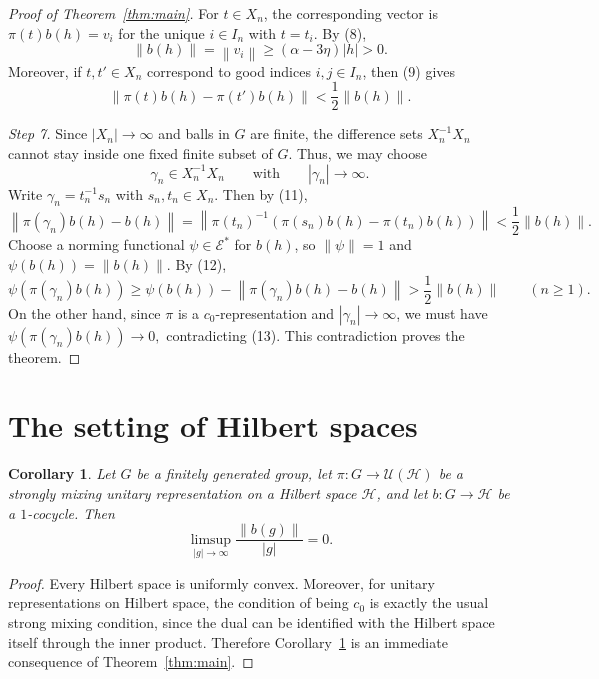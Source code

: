 \documentclass[a4paper,11pt]{amsproc}
\newtheorem{corollary}[theorem]{Corollary}
\theoremstyle{remark}
\newcommand{\norm}[1]{\left\lVert #1\right\rVert}
\newcommand{\cE}{\mathcal E}
\newcommand{\cH}{\mathcal H}
\begin{document}
\begin{proof}[Proof of Theorem~\ref{thm:main}]
For $t\in X_{n}$, the corresponding vector is
$
\pi(t)b(h)=v_{i}
$
for the unique $i\in I_{n}$ with $t=t_{i}$. By (8),
\[
\norm{b(h)}=\norm{v_{i}}\ge (\alpha-3\eta)|h|>0.
\tag{10}
\]
Moreover, if $t,t'\in X_{n}$ correspond to good indices $i,j\in I_{n}$, then (9) gives
\[
\lVert\pi(t)b(h)-\pi(t')b(h)\rVert<\frac12\norm{b(h)}.
\tag{11}
\]

\medskip

\noindent
\emph{Step 7.}
Since $|X_{n}|\to\infty$ and balls in $G$ are finite, the difference sets $X_{n}^{-1}X_{n}$ cannot stay inside one fixed finite subset of $G$. Thus, we may choose
\[
\gamma_{n}\in X_{n}^{-1}X_{n}
\qquad\text{with}\qquad
|\gamma_{n}|\to\infty.
\]
Write $\gamma_{n}=t_{n}^{-1}s_{n}$ with $s_{n},t_{n}\in X_{n}$. Then by (11),
\[
\norm{\pi(\gamma_{n})b(h)-b(h)}
=\norm{\pi(t_{n})^{-1}(\pi(s_{n})b(h)-\pi(t_{n})b(h))}<\frac12\norm{b(h)}.
\tag{12}
\]
Choose a norming functional $\psi\in \cE^{\ast}$ for $b(h)$, so $\norm{\psi}=1$ and $\psi(b(h))=\norm{b(h)}$. By (12),
\[
\psi(\pi(\gamma_{n})b(h))
\ge \psi(b(h))-\norm{\pi(\gamma_{n})b(h)-b(h)}
>\frac12\norm{b(h)}
\qquad (n\ge 1).
\tag{13}
\]
On the other hand, since $\pi$ is a $c_{0}$-representation and $|\gamma_{n}|\to\infty$, we must have
$
\psi(\pi(\gamma_{n})b(h))\to 0,
$
contradicting (13). This contradiction proves the theorem.
\end{proof}



\section{The setting of Hilbert spaces}

\begin{corollary}\label{cor:hilbert}
Let $G$ be a finitely generated group, let $\pi\colon G\to \mathcal U(\cH)$ be a strongly mixing unitary representation on a Hilbert space $\cH$, and let $b\colon G\to \cH$ be a $1$-cocycle. Then
\[
\limsup_{|g|\to\infty}\frac{\norm{b(g)}}{|g|}=0.
\]
\end{corollary}

\begin{proof}
Every Hilbert space is uniformly convex. Moreover, for unitary representations on Hilbert space, the condition of being $c_{0}$ is exactly the usual strong mixing condition, since the dual can be identified with the Hilbert space itself through the inner product. Therefore Corollary~\ref{cor:hilbert} is an immediate consequence of Theorem~\ref{thm:main}.
\end{proof}
\end{document}
